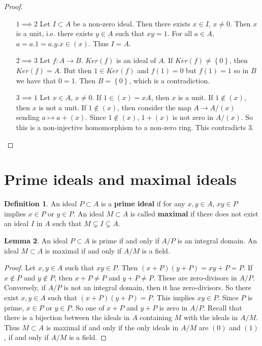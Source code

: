\documentclass{article}
\newcommand{\rb}[1]{\left( #1 \right)}
\newcommand{\cb}[1]{\left\{ #1 \right\}}
\theoremstyle{definition}\newtheorem{definition}{Definition}[section]
\theoremstyle{definition}\newtheorem{remark}[definition]{Remark}
\theoremstyle{definition}\newtheorem*{example}{Example}
\theoremstyle{definition}\newtheorem*{note}{Note}
\newtheorem{lemma}[definition]{Lemma}
\begin{document}
\begin{proof}
\hfill
\begin{itemize}[leftmargin=2cm]
\item[$ 1 \implies 2 $] Let $ I \subset A $ be a non-zero ideal. Then there exists $ x \in I $, $ x \ne 0 $. Then $ x $ is a unit, i.e. there exists $ y \in A $ such that $ xy = 1 $. For all $ a \in A $, $ a = a.1 = a.y.x \in \rb{x} $. Thus $ I = A $.
\item[$ 2 \implies 3 $] Let $ f : A \to B $. $ Ker\rb{f} $ is an ideal of $ A $. If $ Ker\rb{f} \ne \cb{0} $, then $ Ker\rb{f} = A $. But then $ 1 \in Ker\rb{f} $ and $ f\rb{1} = 0 $ but $ f\rb{1} = 1 $ so in $ B $ we have that $ 0 = 1 $. Then $ B = \cb{0} $, which is a contradiction.
\item[$ 3 \implies 1 $] Let $ x \in A $, $ x \ne 0 $. If $ 1 \in \rb{x} = xA $, then $ x $ is a unit. If $ 1 \notin \rb{x} $, then $ x $ is not a unit. If $ 1 \notin \rb{x} $, then consider the map $ A \to A / \rb{x} $ sending $ a \mapsto a + \rb{x} $. Since $ 1 \notin \rb{x} $, $ 1 + \rb{x} $ is not zero in $ A / \rb{x} $. So this is a non-injective homomorphism to a non-zero ring. This contradicts $ 3 $.
\end{itemize}
\end{proof}

\section{Prime ideals and maximal ideals}

\begin{definition}
An ideal $ P \subset A $ is a \textbf{prime ideal} if for any $ x, y \in A $, $ xy \in P $ implies $ x \in P $ or $ y \in P $. An ideal $ M \subset A $ is called \textbf{maximal} if there does not exist an ideal $ I $ in $ A $ such that $ M \subsetneq I \subsetneq A $.
\end{definition}

\begin{lemma}
An ideal $ P \subset A $ is prime if and only if $ A / P $ is an integral domain. An ideal $ M \subset A $ is maximal if and only if $ A / M $ is a field.
\end{lemma}

\begin{proof}
Let $ x, y \in A $ such that $ xy \in P $. Then $ \rb{x + P}\rb{y + P} = xy + P = P $. If $ x \notin P $ and $ y \notin P $, then $ x + P \ne P $ and $ y + P \ne P $. These are zero-divisors in $ A / P $. Conversely, if $ A / P $ is not an integral domain, then it has zero-divisors. So there exist $ x, y \in A $ such that $ \rb{x + P}\rb{y + P} = P $. This implies $ xy \in P $. Since $ P $ is prime, $ x \in P $ or $ y \in P $. So one of $ x + P $ and $ y + P $ is zero in $ A / P $. Recall that there is a bijection between the ideals in $ A $ containing $ M $ with the ideals in $ A / M $. Thus $ M \subset A $ is maximal if and only if the only ideals in $ A / M $ are $ \rb{0} $ and $ \rb{1} $, if and only if $ A / M $ is a field.
\end{proof}
\end{document}
